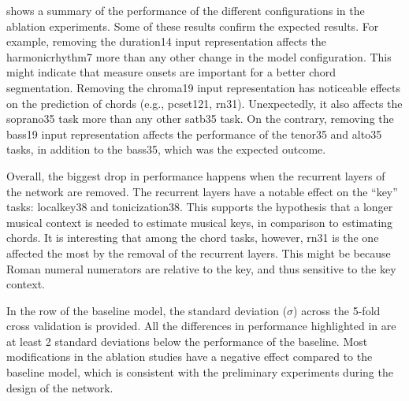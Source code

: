 

 shows a summary of the performance of the
different configurations in the ablation experiments. Some
of these results confirm the expected results. For example,
removing the \gls{duration14} input representation affects
the \gls{harmonicrhythm7} more than any other change in the
model configuration. This might indicate that measure onsets
are important for a better chord segmentation. Removing the
\gls{chroma19} input representation has noticeable effects
on the prediction of chords (e.g., \gls{pcset121},
\gls{rn31}). Unexpectedly, it also affects the
\gls{soprano35} task more than any other \gls{satb35} task.
On the contrary, removing the \gls{bass19} input
representation affects the performance of the \gls{tenor35}
and \gls{alto35} tasks, in addition to the \gls{bass35},
which was the expected outcome.

Overall, the biggest drop in performance happens when the
recurrent layers of the network are removed. The recurrent
layers have a notable effect on the ``key'' tasks:
\gls{localkey38} and \gls{tonicization38}. This supports the
hypothesis that a longer musical context is needed to
estimate musical keys, in comparison to estimating chords.
It is interesting that among the chord tasks, however,
\gls{rn31} is the one affected the most by the removal of
the recurrent layers. This might be because Roman numeral
numerators are relative to the key, and thus sensitive to
the key context.

In the row of the baseline model, the standard deviation
($\sigma$) across the 5-fold cross validation is provided.
All the differences in performance highlighted in
 are at least 2 standard deviations below
the performance of the baseline. Most modifications in the
ablation studies have a negative effect compared to the
baseline model, which is consistent with the preliminary
experiments during the design of the network. 
